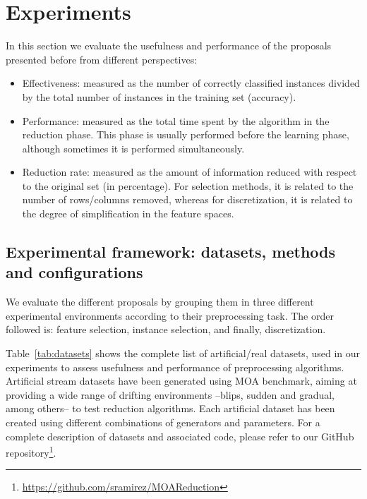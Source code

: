 \documentclass[preprint,12pt]{elsarticle}
\begin{document}

\section*{Experiments}

In this section we evaluate the usefulness and performance of the proposals presented before from different perspectives:

\begin{itemize}
	\item Effectiveness: measured as the number of correctly classified instances divided by the total number of instances in the training set (accuracy).
	\item Performance: measured as the total time spent by the algorithm in the reduction phase. This phase is usually performed before the learning phase, although sometimes it is performed simultaneously.
	\item Reduction rate: measured as the amount of information reduced with respect to the original set (in percentage). For selection methods, it is related to the number of rows/columns removed, whereas for discretization, it is related to the degree of simplification in the feature spaces.
\end{itemize} 

\subsection{Experimental framework: datasets, methods and configurations}

We evaluate the different proposals by grouping them in three different experimental environments according to their preprocessing task. The order followed is: feature selection, instance selection, and finally, discretization.

Table~\ref{tab:datasets} shows the complete list of artificial/real datasets, used in our experiments to assess usefulness and performance of preprocessing algorithms. Artificial stream datasets have been generated using MOA benchmark, aiming at providing a wide range of drifting environments --blips, sudden and gradual, among others-- to test reduction algorithms. Each artificial dataset has been created using different combinations of generators and parameters. For a complete description of datasets and associated code, please refer to our GitHub repository\footnote{\url{https://github.com/sramirez/MOAReduction}}. 
\end{document}

